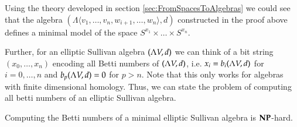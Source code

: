  \begin{Remark}
  Using the theory developed in section \ref{sec:FromSpacesToAlgebras} we could see 
  that the algebra $ (\Lambda \langle v_1, \ldots, v_n,w_{i+1}, \ldots, w_n \rangle , d)$
  constructed in the proof above defines
  a minimal model of the space $S^{x_1} \times \ldots \times S^{x_n}$.
 \end{Remark}

 
 Further, for an elliptic Sullivan algebra $(\Lambda V,d)$ we can think of a bit string $(x_0, \ldots, x_n)$ encoding all 
 Betti numbers of $(\Lambda V,d)$, i.e. $x_i = b_i (\Lambda V,d)$ for $i = 0,\ldots, n$ and $b_p (\Lambda V,d) = 0$ for $p > n$.
 Note that this only works for algebras with finite dimensional homology. Thus, we can state the problem of computing all
 betti numbers of an elliptic Sullivan algebra.
  
  
 
 \begin{Corollary}
 \label{thm:AlgebrasComputingBettiNumbers}
  Computing the Betti numbers of a minimal elliptic Sullivan algebra is $\mathbf{NP}$-hard.
 \end{Corollary}
